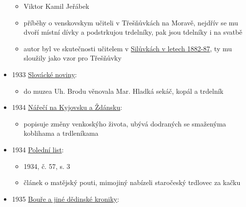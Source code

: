 \begin{itemize}
  \begin{itemize}
  \tightlist
  \item
    Viktor Kamil Jeřábek
  \item
    příběhy o venskovskym učiteli v Třešňůvkách na Moravě, nejdřív se mu
    dvoří místní dívky a podstrkujou trdelníky, pak jsou tdelníky i na
    svatbě
  \item
    autor byl ve skutečnosti učitelem v
    \href{https://kramerius.lib.cas.cz/view/uuid:48220bc0-4294-11e2-b246-005056827e52?page=uuid\%3A04efbdca-01ec-4111-8df2-32a5f52f4c16}{Silůvkách
    v letech 1882-87}, ty mu sloužily jako vzor pro Třešňůvky
  \end{itemize}
\item
  1933
  \href{https://www.digitalniknihovna.cz/vkol/uuid/uuid:349c38c2-fadc-4992-a172-9aacc818e434}{Slovácké
  noviny}:

  \begin{itemize}
  \tightlist
  \item
    do muzea Uh. Brodu věnovala Mar. Hladká sekáč, kopál a trdelník
  \end{itemize}
\item
  1934
  \href{https://ceskadigitalniknihovna.cz/view/uuid:e1259815-3caf-4b6b-af1d-8ada80900484?page=uuid\%3A8bb1ba0a-525b-11e5-a788-0050569d679d&fulltext=trdeln\%C3\%ADk\%20OR\%20trdeln\%C3\%ADky\%20OR\%20trdeln\%C3\%ADk\%C5\%AF&source=mzk}{Nářečí
  na Kyjovsku a Ždánsku}:

  \begin{itemize}
  \tightlist
  \item
    popisuje změny venkoskýho života, ubývá dodraných se smaženýma
    koblihama a trdleníkama
  \end{itemize}
\item
  1934
  \href{https://ceskadigitalniknihovna.cz/view/uuid:c1ecf480-9c2d-11e3-8b69-005056825209?page=uuid\%3Ac53ff231-d798-11e3-94ef-5ef3fc9ae867&fulltext=trdlovec&source=nkp}{Polední
  list}:

  \begin{itemize}
  \tightlist
  \item
    1934, č. 57, s. 3
  \item
    článek o matějský pouti, mimojiný nabízeli staročeský trdlovec za
    kačku
  \end{itemize}
\item
  1935
  \href{https://ceskadigitalniknihovna.cz/view/uuid:9e3e00c0-1eb9-11ed-bb16-005056827e52?page=uuid\%3Ac70b483f-d1ae-48f7-9b87-ec788605bd6c&fulltext=trdeln*&source=mzk}{Bouře
  a jiné dědinské kroniky}:


\end{itemize}

